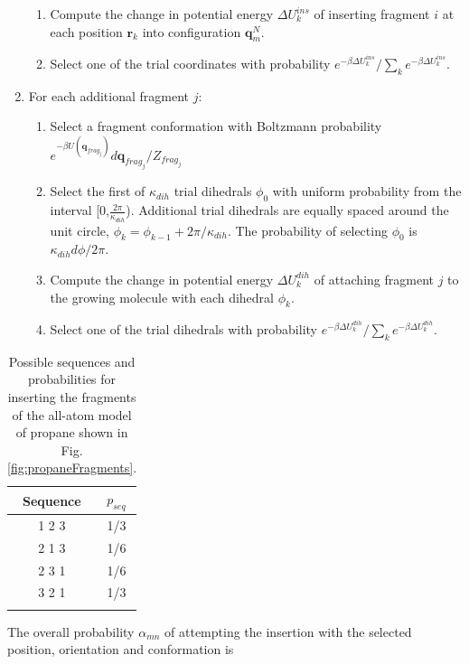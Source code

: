\begin{enumerate}
\begin{enumerate}
		\item Compute the change in potential energy $\Delta U_k^{ins}$ of inserting fragment $i$ at each position $\mathbf{r}_k$ into configuration $\mathbf{q}_m^N$.
		\item Select one of the trial coordinates with probability $e^{-\beta \Delta U_k^{ins}} / \sum_k{e^{-\beta \Delta U_k^{ins}}}$.
	\end{enumerate}
	\item For each additional fragment $j$:
	\begin{enumerate}
		\item Select a fragment conformation with Boltzmann probability\newline$e^{-\beta U(\mathbf{q}_{frag_j})}d\mathbf{q}_{frag_j}/Z_{frag_j}$
		\item Select the first of $\kappa_{dih}$ trial dihedrals $\phi_0$ with uniform probability from the interval [0,$\frac{2\pi}{\kappa_{dih}}$). Additional trial dihedrals are equally spaced around the unit circle, $\phi_k=\phi_{k-1}+2\pi/\kappa_{dih}$. The probability of selecting $\phi_0$ is $\kappa_{dih}d\phi/2\pi$.
		\item Compute the change in potential energy $\Delta U_k^{dih}$ of attaching fragment $j$ to the growing molecule with each dihedral $\phi_k$.
		\item Select one of the trial dihedrals with probability $e^{-\beta \Delta U_k^{dih}} / \sum_k{e^{-\beta \Delta U_k^{dih}}}$.
	\end{enumerate}
\end{enumerate}

\begin{table}
\caption{Possible sequences and probabilities for inserting the fragments of the all-atom model of propane shown in Fig. \ref{fig:propaneFragments}.}
\label{table:propane}
\centering
\begin{tabular}{|c|c|} \hline
 {\bf Sequence} & {\bf $p_{seq}$} \\ \hline
 1 2 3 & 1/3 \\
 2 1 3 & 1/6 \\
 2 3 1 & 1/6 \\
 3 2 1 & 1/3 \\
 \hline
\multicolumn{2}{c}{}
\end{tabular}
\end{table}

The overall probability $\alpha_{mn}$ of attempting the insertion with the selected position, orientation and conformation is 

